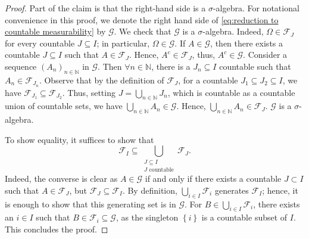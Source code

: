 \documentclass[11pt,a4paper,twoside,openany]{report}
\numberwithin{equation}{section}
\theoremstyle{plain} %
\theoremstyle{definition} %
\theoremstyle{remark} %
\begin{document}
\begin{proof}
 Part of the claim is that the right-hand side is a \(\sigma\)-algebra. For notational convenience in this proof, we denote the right hand side of \eqref{eq:reduction to countable measurability} by \(\mathcal{G}\). We check that \(\mathcal{G}\) is a \(\sigma\)-algebra.
 Indeed, \(\Omega\in \mathcal{F}_J\) for every countable \(J\subseteq I\); in particular, \(\Omega\in \mathcal{G}\). If \(A\in\mathcal{G}\), then there exists a countable \(J\subseteq I\) such that \(A\in\mathcal{F}_J\). Hence, \(A^c\in\mathcal{F}_J\), thus, \(A^c\in\mathcal{G}\). Consider a sequence \((A_n)_{n\in\mathbb{N}}\) in \(\mathcal{G}\). 
 Then \(\forall n\in\mathbb{N}\), there is a \(J_n\subseteq I\) countable such that \(A_n\in \mathcal{F}_{J_n}\). Observe that by the definition of \(\mathcal{F}_J\), for a countable \(J_1\subseteq J_2\subseteq I\), we have \(\mathcal{F}_{J_1}\subseteq\mathcal{F}_{J_2}\). Thus, setting \(J=\bigcup_{n\in\mathbb{N}}J_n\), which is countable as a countable union of countable sets, we have \(\bigcup_{n\in\mathbb{N}}A_n\in\mathcal{G}\). Hence, \(\bigcup_{n\in\mathbb{N}}A_n\in\mathcal{F}_{J}\). \(\mathcal{G}\) is a \(\sigma\)-algebra. 



 To show equality, it suffices to show that 
 \begin{equation*}
     \mathcal{F}_I\subseteq \bigcup_{\substack{J\subseteq I\\ J\text{ countable}}}\mathcal{F}_J.
 \end{equation*}
Indeed, the converse is clear as \(A\in\mathcal{G}\) if and only if there exists a countable \(J\subset I\) such that \(A\in\mathcal{F}_J\), but \(\mathcal{F}_J\subseteq \mathcal{F}_I\).
By definition, \(\bigcup_{i\in I}\mathcal{F}_i\) generates \(\mathcal{F}_I\); hence, it is enough to show that this generating set is in \(\mathcal{G}\). For \(B\in\bigcup_{i\in I}\mathcal{F}_i\), there exists an \(i\in I\) such that \(B\in \mathcal{F}_i\subseteq\mathcal{G}\), as the singleton \(\left\{i\right\}\) is a countable subset of \(I\). This concludes the proof. 
\end{proof}
 
\end{document}
